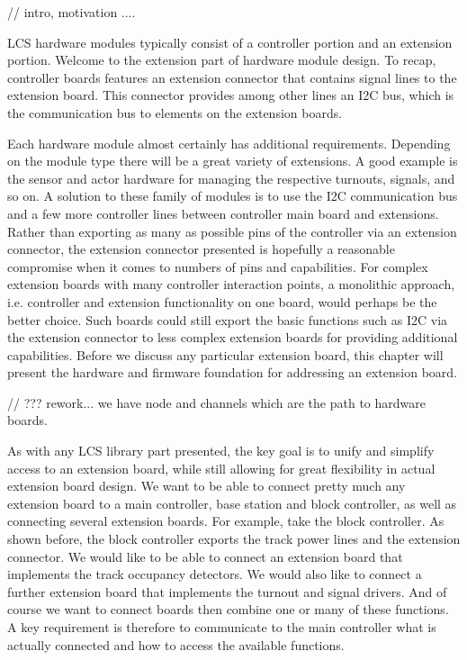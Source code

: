 
// intro, motivation ....



LCS hardware modules typically consist of a controller portion and an extension portion. Welcome to the extension part of hardware module design. To recap, controller boards features an extension connector that contains signal lines to the extension board. This connector provides among other lines an I2C bus, which is the communication bus to elements on the extension boards.

Each hardware module almost certainly has additional requirements. Depending on the module type there will be a great variety of extensions. A good example is the sensor and actor hardware for managing the respective turnouts, signals, and so on. A solution to these family of modules is to use the I2C communication bus and a few more controller lines between controller main board and extensions. Rather than exporting as many as possible pins of the controller via an extension connector, the extension connector presented is hopefully a reasonable compromise when it comes to numbers of pins and capabilities. For complex extension boards with many controller interaction points, a monolithic approach, i.e. controller and extension functionality on one board, would perhaps be the better choice. Such boards could still export the basic functions such as I2C via the extension connector to less complex extension boards for providing additional capabilities. Before we discuss any particular extension board, this chapter will present the hardware and firmware foundation for addressing an extension board.


// ??? rework... we have node and channels which are the path to hardware boards.



As with any LCS library part presented, the key goal is to unify and simplify access to an extension board, while still allowing for great flexibility in actual extension board design. We want to be able to connect pretty much any extension board to a main controller, base station and block controller, as well as connecting several extension boards. For example, take the block controller. As shown before, the block controller exports the track power lines and the extension connector. We would like to be able to connect an extension board that implements the track occupancy detectors. We would also like to connect a further extension board that implements the turnout and signal drivers. And of course we want to connect boards then combine one or many of these functions. A key requirement is therefore to communicate to the main controller what is actually connected and how to access the available functions.

